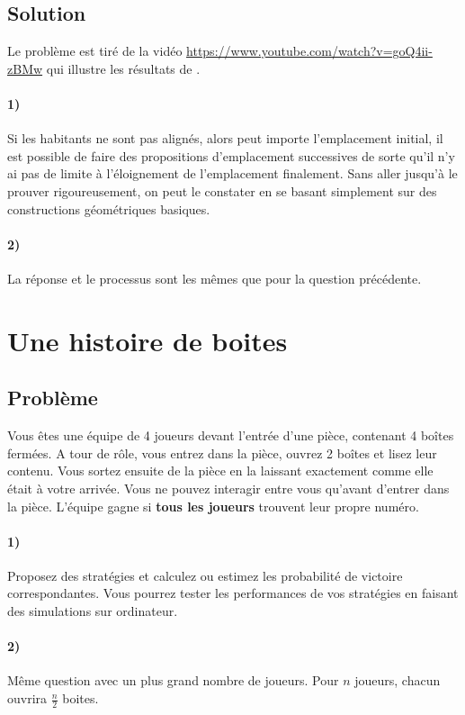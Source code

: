 \documentclass[a4paper,10pt,oneside]{article}
\begin{document}
\subsection{Solution}

Le problème est tiré de la vidéo \url{https://www.youtube.com/watch?v=goQ4ii-zBMw} qui illustre les résultats de \cite{MCKELVEY1976472}.

\paragraph*{1)} 
Si les habitants ne sont pas alignés, alors peut importe l'emplacement initial, il est possible de faire des propositions d'emplacement successives de sorte qu'il n'y ai pas de limite à l'éloignement de l'emplacement finalement.
Sans aller jusqu'à le prouver rigoureusement, on peut le constater en se basant simplement sur des constructions géométriques basiques.

\paragraph*{2)}
La réponse et le processus sont les mêmes que pour la question précédente.


\section{Une histoire de boites}

\subsection{Problème}
Vous êtes une équipe de 4 joueurs devant l'entrée d'une pièce, contenant 4 boîtes fermées.
A tour de rôle, vous entrez dans la pièce, ouvrez 2 boîtes et lisez leur contenu.
Vous sortez ensuite de la pièce en la laissant exactement comme elle était à votre arrivée. 
Vous ne pouvez interagir entre vous qu'avant d'entrer dans la pièce.
L'équipe gagne si \textbf{tous les joueurs} trouvent leur propre numéro. 



\paragraph*{1)}
Proposez des stratégies et calculez ou estimez les probabilité de victoire correspondantes.
Vous pourrez tester les performances de vos stratégies en faisant des simulations sur ordinateur.

\paragraph*{2)} Même question avec un plus grand nombre de joueurs. Pour $n$ joueurs, chacun ouvrira $\frac{n}{2}$ boites.
\end{document}
